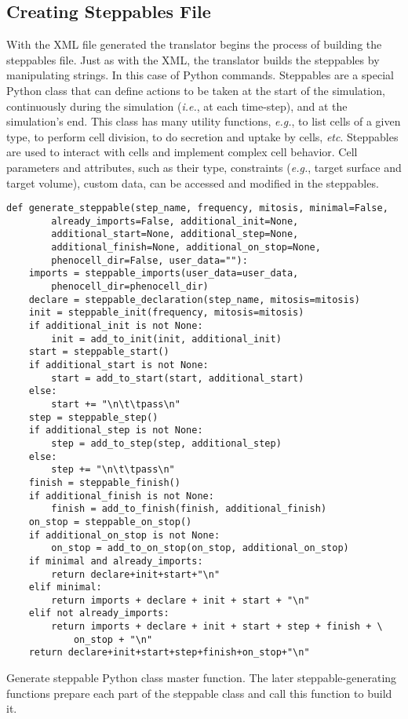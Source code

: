 \subsection{Creating Steppables File}\label{sec:trans:gen:step}
With the XML file generated the translator begins the process of building the steppables file. Just as with the XML, the translator builds the steppables by 
manipulating strings. In this case of Python commands. 
Steppables are a special \ccds Python class that can define actions to be taken at the start of the simulation, continuously during the simulation (\textit{i.e.}, at each time-step), and at the simulation's end. This class has 
many utility functions, \textit{e.g.}, to
list cells of a given type, to perform cell division, to do secretion and uptake by cells, \textit{etc}. Steppables are used to interact with cells and implement complex cell behavior. 
Cell parameters and attributes, such as their type, constraints (\textit{e.g.}, target surface and target volume), custom data, can be accessed and modified in the steppables.

\begin{listing}[H]%
\begin{verbatim}
def generate_steppable(step_name, frequency, mitosis, minimal=False, 
        already_imports=False, additional_init=None, 
        additional_start=None, additional_step=None, 
        additional_finish=None, additional_on_stop=None,
        phenocell_dir=False, user_data=""):
    imports = steppable_imports(user_data=user_data, 
        phenocell_dir=phenocell_dir)
    declare = steppable_declaration(step_name, mitosis=mitosis)
    init = steppable_init(frequency, mitosis=mitosis)
    if additional_init is not None:
        init = add_to_init(init, additional_init)
    start = steppable_start()
    if additional_start is not None:
        start = add_to_start(start, additional_start)
    else:
        start += "\n\t\tpass\n"
    step = steppable_step()
    if additional_step is not None:
        step = add_to_step(step, additional_step)
    else:
        step += "\n\t\tpass\n"
    finish = steppable_finish()
    if additional_finish is not None:
        finish = add_to_finish(finish, additional_finish)
    on_stop = steppable_on_stop()
    if additional_on_stop is not None:
        on_stop = add_to_on_stop(on_stop, additional_on_stop)
    if minimal and already_imports:
        return declare+init+start+"\n"
    elif minimal:
        return imports + declare + init + start + "\n"
    elif not already_imports:
        return imports + declare + init + start + step + finish + \
            on_stop + "\n"
    return declare+init+start+step+finish+on_stop+"\n"
\end{verbatim}
\caption{Generate steppable Python class master function. The later steppable-generating functions prepare each part of the steppable class and call this function to build it.}\label{code:trans:cc3d:create-steps:generate-function}
\end{listing}

